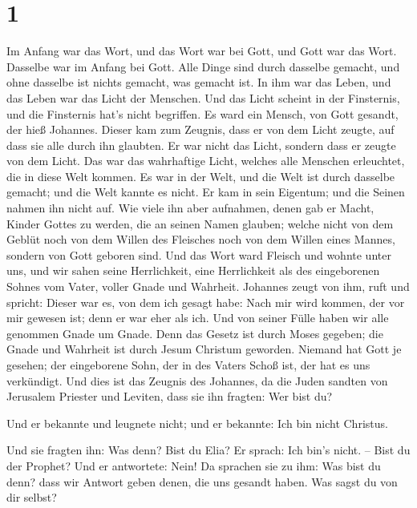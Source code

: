 \hypertarget{section}{%
\section{1}\label{section}}

 Im Anfang war das Wort, und das Wort war bei Gott, und
Gott war das Wort.  Dasselbe war im Anfang bei Gott.
 Alle Dinge sind durch dasselbe gemacht, und ohne dasselbe
ist nichts gemacht, was gemacht ist.  In ihm war das
Leben, und das Leben war das Licht der Menschen.  Und das
Licht scheint in der Finsternis, und die Finsternis hat's nicht
begriffen.  Es ward ein Mensch, von Gott gesandt, der hieß
Johannes.  Dieser kam zum Zeugnis, dass er von dem Licht
zeugte, auf dass sie alle durch ihn glaubten.  Er war
nicht das Licht, sondern dass er zeugte von dem Licht. 
Das war das wahrhaftige Licht, welches alle Menschen erleuchtet, die in
diese Welt kommen.  Es war in der Welt, und die Welt ist
durch dasselbe gemacht; und die Welt kannte es nicht.  Er
kam in sein Eigentum; und die Seinen nahmen ihn nicht auf.
 Wie viele ihn aber aufnahmen, denen gab er Macht, Kinder
Gottes zu werden, die an seinen Namen glauben;  welche
nicht von dem Geblüt noch von dem Willen des Fleisches noch von dem
Willen eines Mannes, sondern von Gott geboren sind.  Und
das Wort ward Fleisch und wohnte unter uns, und wir sahen seine
Herrlichkeit, eine Herrlichkeit als des eingeborenen Sohnes vom Vater,
voller Gnade und Wahrheit.  Johannes zeugt von ihm, ruft
und spricht: Dieser war es, von dem ich gesagt habe: Nach mir wird
kommen, der vor mir gewesen ist; denn er war eher als ich.
 Und von seiner Fülle haben wir alle genommen Gnade um
Gnade.  Denn das Gesetz ist durch Moses gegeben; die
Gnade und Wahrheit ist durch Jesum Christum geworden. 
Niemand hat Gott je gesehen; der eingeborene Sohn, der in des Vaters
Schoß ist, der hat es uns verkündigt.  Und dies ist das
Zeugnis des Johannes, da die Juden sandten von Jerusalem Priester und
Leviten, dass sie ihn fragten: Wer bist du?

 Und er bekannte und leugnete nicht; und er bekannte: Ich
bin nicht Christus.

 Und sie fragten ihn: Was denn? Bist du Elia? Er sprach:
Ich bin's nicht. -- Bist du der Prophet? Und er antwortete: Nein!
 Da sprachen sie zu ihm: Was bist du denn? dass wir
Antwort geben denen, die uns gesandt haben. Was sagst du von dir selbst?

